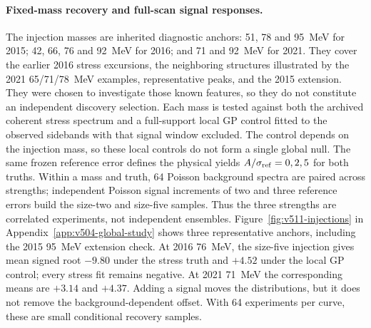 \paragraph{Fixed-mass recovery and full-scan signal responses.}
The injection masses are inherited diagnostic anchors: 51, 78 and 95~MeV
for 2015; 42, 66, 76 and 92~MeV for 2016; and 71 and 92~MeV for 2021.
They cover the earlier 2016 stress excursions, the neighboring structures
illustrated by the 2021 65/71/78~MeV examples, representative peaks, and
the 2015 extension. They were chosen to investigate those known
features, so they do not constitute an independent discovery selection.
Each mass is tested against both the archived coherent stress spectrum
and a full-support local GP control fitted to the observed sidebands
with that signal window excluded. The control depends on the injection
mass, so these local controls do not form a single global null. The same frozen reference
error defines the physical yields $A/\sigma_{\rm ref}=0,2,5$ for both
truths. Within a mass and truth, 64 Poisson background spectra are paired
across strengths; independent Poisson signal increments of two and three
reference errors build the size-two and size-five samples. Thus the
three strengths are correlated experiments, not independent ensembles.
Figure~\ref{fig:v511-injections} in Appendix~\ref{app:v504-global-study}
shows three representative anchors, including the 2015 95~MeV extension check.
At 2016 76~MeV, the size-five injection gives mean signed root $-9.80$
under the stress truth and $+4.52$ under the local GP control; every
stress fit remains negative. At 2021 71~MeV the corresponding means are
$+3.14$ and $+4.37$. Adding a signal moves the distributions, but it does
not remove the background-dependent offset. With 64 experiments per
curve, these are small conditional recovery samples.


